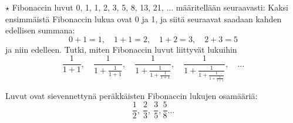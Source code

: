 \begin{tehtavasivu}
\begin{tehtava}
	$\star$ Fibonaccin luvut 0, 1, 1, 2, 3, 5, 8, 13, 21, $\ldots$ määritellään seuraavasti: Kaksi ensimmäistä
	Fibonaccin lukua ovat 0 ja 1, ja siitä seuraavat saadaan kahden
	edellisen summana: \[ 0+1=1, \quad 1+1=2, \quad 1+2 = 3, \quad 2+3=5 \] 
	ja niin edelleen. 
	Tutki, miten Fibonaccin luvut liittyvät lukuihin
	\[ \frac{1}{1+1}, \quad \frac{1}{1+\frac{1}{1+1}}, \quad
	\frac{1}{1+\frac{1}{1+\frac{1}{1+1}}}, \quad 
	\frac{1}{1+\frac{1}{1+\frac{1}{1+\frac{1}{1+1}}}}, \quad \ldots\]
	\begin{vastaus}
		Luvut ovat sievennettynä peräkkäisten Fibonaccin
		lukujen osamääriä:
		\[\frac{1}{2}, \ \frac{2}{3}, \ \frac{3}{5}, \frac{5}{8} \ldots  \]
	\end{vastaus}
\end{tehtava}

\begin{tehtava}
	\begin{alakohdat}
	\end{alakohdat}
	\begin{vastaus}
		\begin{alakohdat}
			\alakohta{$\frac{1}{n(n+1)}$}
			\alakohta{$1-\frac{1}{n}$}
		\end{alakohdat}
	\end{vastaus}
\end{tehtava}

\end{tehtavasivu}

